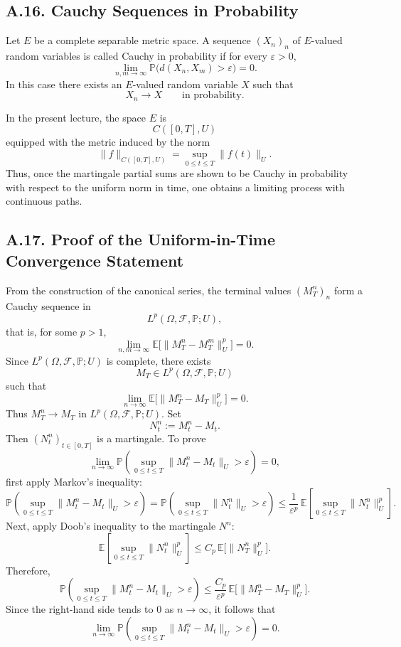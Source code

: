 \documentclass[11pt]{article}
\theoremstyle{definition}
\theoremstyle{remark}
\begin{document}
\subsection*{A.16. Cauchy Sequences in Probability}
Let \(E\) be a complete separable metric space. A sequence \((X_n)_n\) of \(E\)-valued random variables is called Cauchy in probability if for every \(\varepsilon>0\),
\[
\lim_{n,m\to\infty}\mathbb P\bigl(d(X_n,X_m)>\varepsilon\bigr)=0.
\]
In this case there exists an \(E\)-valued random variable \(X\) such that
\[
X_n\to X
\qquad \text{in probability}.
\]

In the present lecture, the space \(E\) is
\[
C([0,T],U)
\]
equipped with the metric induced by the norm
\[
\|f\|_{C([0,T],U)}=\sup_{0\le t\le T}\|f(t)\|_U.
\]
Thus, once the martingale partial sums are shown to be Cauchy in probability with respect to the uniform norm in time, one obtains a limiting process with continuous paths.

\subsection*{A.17. Proof of the Uniform-in-Time Convergence Statement}
From the construction of the canonical series, the terminal values \((M_T^n)_n\) form a Cauchy sequence in
\[
L^p(\Omega,\mathcal F,\mathbb P;U),
\]
that is, for some \(p>1\),
\[
\lim_{n,m\to\infty}\mathbb E\bigl[\|M_T^n-M_T^m\|_U^p\bigr]=0.
\]
Since \(L^p(\Omega,\mathcal F,\mathbb P;U)\) is complete, there exists
\[
M_T\in L^p(\Omega,\mathcal F,\mathbb P;U)
\]
such that
\[
\lim_{n\to\infty}\mathbb E\bigl[\|M_T^n-M_T\|_U^p\bigr]=0.
\]
Thus \(M_T^n\to M_T\) in \(L^p(\Omega,\mathcal F,\mathbb P;U)\).
Set
\[
N_t^n:=M_t^n-M_t.
\]
Then \((N_t^n)_{t\in[0,T]}\) is a martingale. To prove
\[
\lim_{n\to\infty}\mathbb P\left(\sup_{0\le t\le T}\|M_t^n-M_t\|_U>\varepsilon\right)=0,
\]
first apply Markov's inequality:
\[
\mathbb P\left(\sup_{0\le t\le T}\|M_t^n-M_t\|_U>\varepsilon\right)
=
\mathbb P\left(\sup_{0\le t\le T}\|N_t^n\|_U>\varepsilon\right)
\le
\frac{1}{\varepsilon^p}\,
\mathbb E\left[\sup_{0\le t\le T}\|N_t^n\|_U^p\right].
\]
Next, apply Doob's inequality to the martingale \(N^n\):
\[
\mathbb E\left[\sup_{0\le t\le T}\|N_t^n\|_U^p\right]
\le
C_p\,\mathbb E\bigl[\|N_T^n\|_U^p\bigr].
\]
Therefore,
\[
\mathbb P\left(\sup_{0\le t\le T}\|M_t^n-M_t\|_U>\varepsilon\right)
\le
\frac{C_p}{\varepsilon^p}\,
\mathbb E\bigl[\|M_T^n-M_T\|_U^p\bigr].
\]
Since the right-hand side tends to \(0\) as \(n\to\infty\), it follows that
\[
\lim_{n\to\infty}\mathbb P\left(\sup_{0\le t\le T}\|M_t^n-M_t\|_U>\varepsilon\right)=0.
\]
\end{document}
